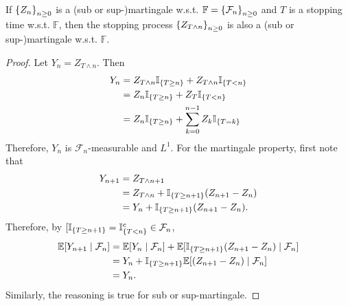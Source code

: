 \begin{thm}
    If $\left\{Z_n\right\}_{n \geq 0}$ is a (sub or sup-)martingale w.s.t. $\mathbb{F} = \left\{\mathcal{F}_n\right\}_{n \geq 0}$ and $T$ is a stopping time w.s.t. $\mathbb{F}$, then the stopping process $\left\{Z_{T\wedge n}\right\}_{n \geq 0}$ is also a (sub or sup-)martingale w.s.t. $\mathbb{F}$.
\end{thm}
\begin{proof}
    Let $Y_n = Z_{T\wedge n}$. Then
    \begin{equation*}
        \begin{aligned}
            Y_n &= Z_{T\wedge n} \mathbb{I}_{\left\{T \geq n\right\}} + Z_{T\wedge n} \mathbb{I}_{\left\{T < n\right\}} \\
            &= Z_n\mathbb{I}_{\left\{T \geq n\right\}} + Z_T\mathbb{I}_{\left\{T < n\right\}} \\
            &= Z_n\mathbb{I}_{\left\{T \geq n\right\}} + \sum_{k=0}^{n-1} Z_k\mathbb{I}_{\left\{T = k\right\}}
        \end{aligned}
    \end{equation*}
    Therefore, $Y_n$ is $\mathcal{F}_n$-measurable and $L^1$. For the martingale property, first note that
    \begin{equation*}
        \begin{aligned}
            Y_{n+1} &= Z_{T\wedge {n+1}} \\
            &= Z_{T\wedge n} + \mathbb{I}_{\left\{T \geq n + 1\right\}}(Z_{n+1}-Z_n) \\
            &= Y_n + \mathbb{I}_{\left\{T \geq n + 1\right\}}(Z_{n+1}-Z_n).
        \end{aligned}
    \end{equation*}
    Therefore, by $[\mathbb{I}_{\left\{T \geq n + 1\right\}} = \mathbb{I}_{\left\{T < n\right\}}^c \in \mathcal{F}_n$,
    \begin{equation*}
        \begin{aligned}
            \mathbb{E}[Y_{n+1} \mid \mathcal{F}_n] &= \mathbb{E}[Y_{n} \mid \mathcal{F}_n] + \mathbb{E}[\mathbb{I}_{\left\{T \geq n + 1\right\}}(Z_{n+1}-Z_n) \mid \mathcal{F}_n] \\
            &= Y_n + \mathbb{I}_{\left\{T \geq n + 1\right\}}\mathbb{E}[(Z_{n+1}-Z_n) \mid \mathcal{F}_n] \\
            &= Y_n.
        \end{aligned}
    \end{equation*}
    Similarly, the reasoning is true for sub or sup-martingale. \qedhere
\end{proof}


